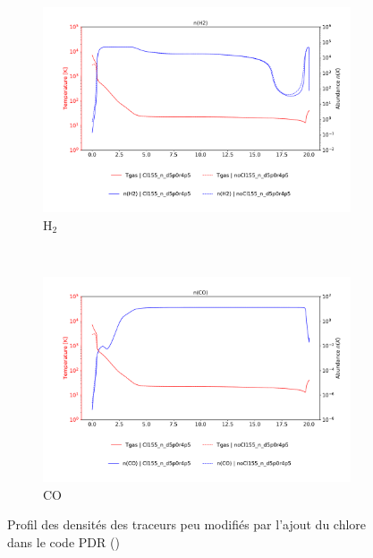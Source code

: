 \begin{figure}[!htbp]
    \begin{subfigure}[t]{0.45\textwidth} %
        \centering \includegraphics[trim = {0 0 0 1.5cm},clip,width=1\textwidth]{figure/Cl/gridModelEmiss/nT_comp_H2.pdf}
        \caption{$\mathrm{H}_2$}
    \end{subfigure}
    ~ 
    \begin{subfigure}[t]{0.45\textwidth} %
        \centering \includegraphics[trim = {0 0 0 1.5cm},clip,width=1\textwidth]{figure/Cl/gridModelEmiss/nT_comp_CO.pdf}
        \caption{$\mathrm{CO}$}
    \end{subfigure}
    
    \caption{Profil des densités des traceurs peu modifiés par l'ajout du chlore dans le code PDR (\uncinq)}
    \label{fig:Cl:gridModelEmiss:nT:no}
\end{figure}

